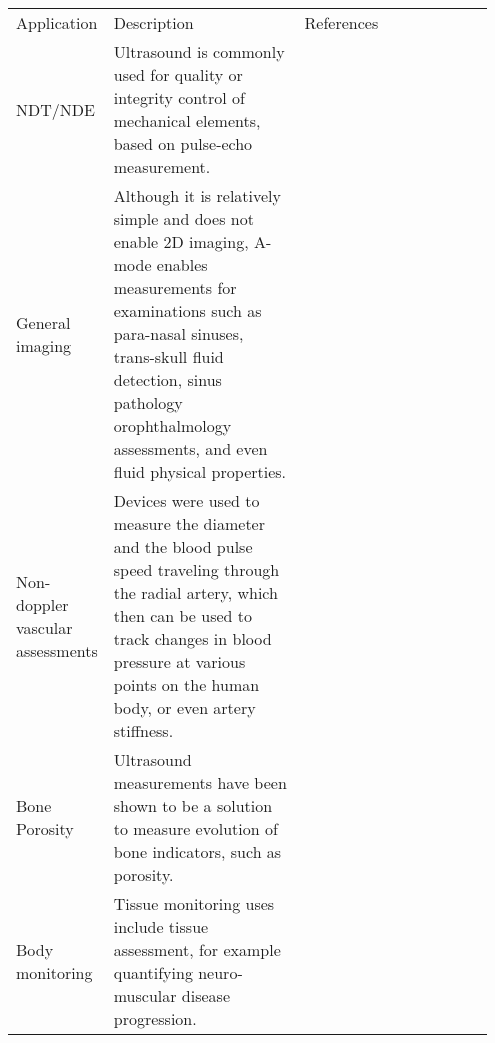
\begin{table}[]
\begin{tabular}{p{0.15\linewidth} | p{0.40\linewidth} | p{0.40\linewidth} }%
Application & Description  & References  \\

 NDT/NDE 
& Ultrasound is commonly used for quality or integrity control of mechanical elements, based on pulse-echo measurement.  
& 
\cite{zhang_fpga_2012,triger_modular_2008,assef_initial_2016,schueler_fundamentals_1984,zhang_autonomous_2018,zhang_implementation_2021,clementi_identification_2020}
\\
General imaging & 
Although it is relatively simple and does not enable 2D imaging, A-mode enables measurements for examinations such as para-nasal sinuses, trans-skull fluid detection, sinus pathology orophthalmology assessments, and even fluid physical properties. 
& \cite{noauthor_wrist_nodate,carotenuto_very_2004,yang_exploration_2021} &  \\  

Non-doppler vascular assessments 
& Devices were used to measure the diameter and the blood pulse speed traveling through the radial artery, which then can be used to track changes in blood pressure at various points on the human body, or even artery stiffness. 
& \cite{worthing_using_2016,hu_design_2011, zhang_multi-channel_2017, shomaji_early_2019,joseph_technical_2015, joseph_artsenstouch_2015, seo_non-invasive_2018} &  \\

Bone Porosity
& Ultrasound measurements have been shown to be a solution to measure evolution of bone indicators, such as porosity.
& \cite{wahab_design_2016, fontes-pereira_monitoring_2018, grasel_characterization_2017} &  \\

 Body monitoring  
& Tissue monitoring uses include tissue assessment, for example quantifying neuro-muscular disease progression.
& \cite{keyes_electrical_2017,zhang_design_2015,brausch_towards_2019,park_ultrasound_2019}  &  \\


\end{tabular}
\end{table}
